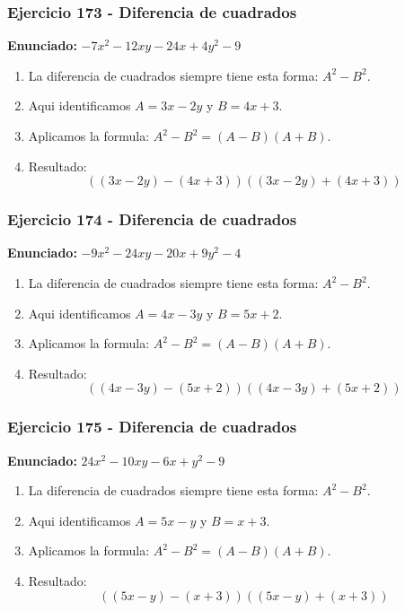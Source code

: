 \documentclass[11pt,a4paper]{article}
\begin{document}
\vspace{0.2cm}
\subsubsection*{Ejercicio 173 - Diferencia de cuadrados}
\textbf{Enunciado:} $ - 7 x^{2} - 12 x y - 24 x + 4 y^{2} - 9 $\par
\begin{enumerate}[leftmargin=2em]
\item La diferencia de cuadrados siempre tiene esta forma: \(A^2-B^2\).
\item Aqui identificamos \(A=3 x - 2 y\) y \(B=4 x + 3\).
\item Aplicamos la formula: \(A^2-B^2=(A-B)(A+B)\).
\item Resultado: \[\boxed{\left(\left(3 x - 2 y\right)-\left(4 x + 3\right)\right)\left(\left(3 x - 2 y\right)+\left(4 x + 3\right)\right)}\]
\end{enumerate}

\vspace{0.2cm}
\subsubsection*{Ejercicio 174 - Diferencia de cuadrados}
\textbf{Enunciado:} $ - 9 x^{2} - 24 x y - 20 x + 9 y^{2} - 4 $\par
\begin{enumerate}[leftmargin=2em]
\item La diferencia de cuadrados siempre tiene esta forma: \(A^2-B^2\).
\item Aqui identificamos \(A=4 x - 3 y\) y \(B=5 x + 2\).
\item Aplicamos la formula: \(A^2-B^2=(A-B)(A+B)\).
\item Resultado: \[\boxed{\left(\left(4 x - 3 y\right)-\left(5 x + 2\right)\right)\left(\left(4 x - 3 y\right)+\left(5 x + 2\right)\right)}\]
\end{enumerate}

\vspace{0.2cm}
\subsubsection*{Ejercicio 175 - Diferencia de cuadrados}
\textbf{Enunciado:} $ 24 x^{2} - 10 x y - 6 x + y^{2} - 9 $\par
\begin{enumerate}[leftmargin=2em]
\item La diferencia de cuadrados siempre tiene esta forma: \(A^2-B^2\).
\item Aqui identificamos \(A=5 x - y\) y \(B=x + 3\).
\item Aplicamos la formula: \(A^2-B^2=(A-B)(A+B)\).
\item Resultado: \[\boxed{\left(\left(5 x - y\right)-\left(x + 3\right)\right)\left(\left(5 x - y\right)+\left(x + 3\right)\right)}\]
\end{enumerate}
\end{document}
